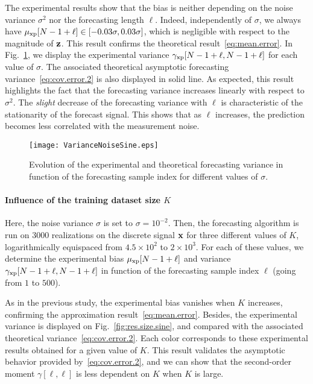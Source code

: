 The experimental results show that the bias is neither depending on the noise variance $\sigma^2$ nor the forecasting length $\ell$. Indeed, independently of $\sigma$, we always have $\mu_{{\mathrm{xp}}}[N-1+\ell]\in\left[-0.03\sigma,0.03\sigma\right]$, which is negligible with respect to the magnitude of ${\mathbf z}$. This result confirms the theoretical result~\eqref{eq:mean.error}. In Fig.~\ref{fig:res.noise.sine}, we display the experimental variance $\gamma_{{\mathrm{xp}}}[N-1+\ell,N-1+\ell]$ for each value of $\sigma$. The associated theoretical asymptotic forecasting variance~\eqref{eq:cov.error.2} is also displayed in solid line. As expected, this result highlights the fact that the forecasting variance increases linearly with respect to $\sigma^2$. The {\em slight} decrease of the forecasting variance with $\ell$ is characteristic of the stationarity of the forecast signal. This shows that as $\ell$ increases, the prediction becomes less correlated with the measurement noise.

\begin{figure}
\centering
\texttt{[image: VarianceNoiseSine.eps]}
\caption{Evolution of the experimental and theoretical forecasting variance in function of the forecasting sample index for different values of $\sigma$.}
\label{fig:res.noise.sine}
\end{figure}

\paragraph{Influence of the training dataset size $K$} Here, the noise variance $\sigma$ is set to $\sigma=10^{-2}$. Then, the forecasting algorithm is run on 3000 realizations on the discrete signal ${\mathbf x}$ for three different values of $K$, logarithmically equispaced from $4.5\times 10^{2}$ to $2\times 10^{3}$. For each of these values, we determine the experimental bias $\mu_{{\mathrm{xp}}}[N-1+\ell]$ and variance $\gamma_{{\mathrm{xp}}}[N-1+\ell,N-1+\ell]$ in function of the forecasting sample index $\ell$ (going from $1$ to $500$). 

As in the previous study, the experimental bias vanishes when $K$ increases, confirming the approximation result~\eqref{eq:mean.error}. Besides, the experimental variance  is displayed on Fig.~\ref{fig:res.size.sine}, and compared with the associated theoretical variance~\eqref{eq:cov.error.2}. Each color corresponds to these experimental results obtained for a given value of $K$. This result validates the asymptotic behavior provided by~\eqref{eq:cov.error.2}, and we can show that the second-order moment $\gamma[\ell,\ell]$ is less dependent on $K$ when $K$ is large.


